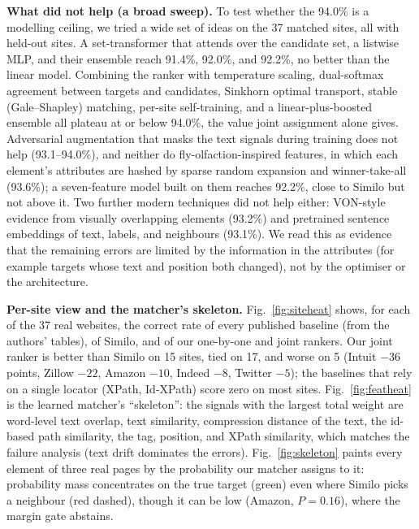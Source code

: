 \documentclass[conference]{IEEEtran}
\begin{document}
\textbf{What did not help (a broad sweep).} To test whether the 94.0\% is a modelling ceiling, we tried a wide set of ideas on the 37 matched sites, all with held-out sites. A set-transformer that attends over the candidate set, a listwise MLP, and their ensemble reach 91.4\%, 92.0\%, and 92.2\%, no better than the linear model. Combining the ranker with temperature scaling, dual-softmax agreement between targets and candidates, Sinkhorn optimal transport, stable (Gale--Shapley) matching, per-site self-training, and a linear-plus-boosted ensemble all plateau at or below 94.0\%, the value joint assignment alone gives. Adversarial augmentation that masks the text signals during training does not help (93.1--94.0\%), and neither do fly-olfaction-inspired features, in which each element's attributes are hashed by sparse random expansion and winner-take-all \cite{dasgupta2017fly} (93.6\%); a seven-feature model built on them reaches 92.2\%, close to Similo but not above it. Two further modern techniques did not help either: VON-style evidence from visually overlapping elements \cite{nass2023von} (93.2\%) and pretrained sentence embeddings of text, labels, and neighbours (93.1\%). We read this as evidence that the remaining errors are limited by the information in the attributes (for example targets whose text and position both changed), not by the optimiser or the architecture.

\textbf{Per-site view and the matcher's skeleton.} Fig.~\ref{fig:siteheat} shows, for each of the 37 real websites, the correct rate of every published baseline (from the authors' tables), of Similo, and of our one-by-one and joint rankers. Our joint ranker is better than Similo on 15 sites, tied on 17, and worse on 5 (Intuit $-36$ points, Zillow $-22$, Amazon $-10$, Indeed $-8$, Twitter $-5$); the baselines that rely on a single locator (XPath, Id-XPath) score zero on most sites. Fig.~\ref{fig:featheat} is the learned matcher's ``skeleton'': the signals with the largest total weight are word-level text overlap, text similarity, compression distance of the text, the id-based path similarity, the tag, position, and XPath similarity, which matches the failure analysis (text drift dominates the errors). Fig.~\ref{fig:skeleton} paints every element of three real pages by the probability our matcher assigns to it: probability mass concentrates on the true target (green) even where Similo picks a neighbour (red dashed), though it can be low (Amazon, $P{=}0.16$), where the margin gate abstains.
\end{document}
